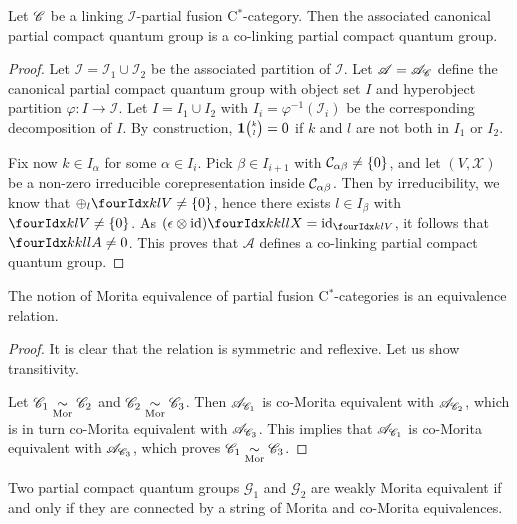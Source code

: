 \begin{Prop}\label{PropCoLink} Let $\mathscr{C}$ be a linking $\mathscr{I}$-partial fusion C$^*$-category. Then the associated canonical partial compact quantum group is a co-linking partial compact quantum group. 
\end{Prop} 

\begin{proof} Let $\mathscr{I}= \mathscr{I}_1\cup \mathscr{I}_2$ be the associated partition of $\mathscr{I}$. Let $\mathscr{A} = \mathscr{A}_{\mathscr{C}}$ define the canonical partial compact quantum group with object set $I$ and hyperobject partition $\varphi:I\rightarrow \mathscr{I}$. Let $I=I_1\cup I_2$ with $I_i = \varphi^{-1}(\mathscr{I}_i)$ be the corresponding decomposition of $I$. By construction, $\mathbf{1}{\tiny {\begin{pmatrix} k\\l\end{pmatrix}}}=0$ if $k$ and $l$ are not both in $I_1$ or $I_2$. 

Fix now $k\in I_{\alpha}$ for some $\alpha \in I_i$. Pick $\beta\in I_{i+1}$ with $\mathcal{C}_{\alpha\beta}\neq\{0\}$, and let $(V,\mathscr{X})$ be a non-zero irreducible corepresentation inside $\mathcal{C}_{\alpha\beta}$. Then by irreducibility, we know that $\oplus_l \Gru{V}{k}{l} \neq \{0\}$, hence there exists $l\in I_{\beta}$ with $\Gru{V}{k}{l}\neq \{0\}$. As $(\epsilon\otimes \id)\Gr{X}{k}{l}{k}{l} = \id_{\Gru{V}{k}{l}}$, it follows that $\Gr{A}{k}{l}{k}{l} \neq 0$. This proves that $\mathscr{A}$ defines a co-linking partial compact quantum group.
\end{proof} 

\begin{Cor} The notion of Morita equivalence of partial fusion C$^*$-categories is an equivalence relation.
\end{Cor} 
\begin{proof}  It is clear that the relation is symmetric and reflexive. Let us show transitivity.

Let $\mathscr{C}_1\underset{\textrm{Mor}}{\sim} \mathscr{C}_2$ and $\mathscr{C}_2\underset{\textrm{Mor}}{\sim} \mathscr{C}_3$. Then $\mathscr{A}_{\mathscr{C}_1}$ is co-Morita equivalent with  $\mathscr{A}_{\mathscr{C}_2}$, which is in turn co-Morita equivalent with $\mathscr{A}_{\mathscr{C}_3}$. This implies that $\mathscr{A}_{\mathscr{C}_1}$ is co-Morita equivalent with $\mathscr{A}_{\mathscr{C}_3}$, which proves $\mathscr{C}_1\underset{\textrm{Mor}}{\sim} \mathscr{C}_3$.
\end{proof} 

\begin{Theorem} Two partial compact quantum groups $\mathscr{G}_1$ and $\mathscr{G}_2$ are weakly Morita equivalent if and only if they are connected by a string of Morita and co-Morita equivalences. 
\end{Theorem}

